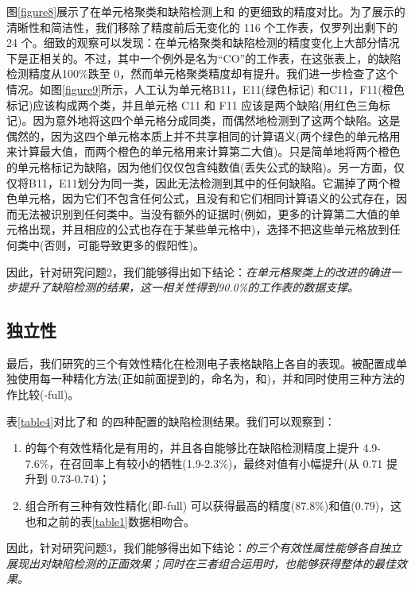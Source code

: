 图\ref{figure8}展示了在单元格聚类和缺陷检测上\wa 和 \cu 的更细致的精度对比。为了展示的清晰性和简洁性，我们移除了精度前后无变化的 116 个工作表，仅罗列出剩下的 24 个。细致的观察可以发现：在单元格聚类和缺陷检测的精度变化上大部分情况下是正相关的。不过，其中一个例外是名为“CO”的工作表，在这张表上，\wa 的缺陷检测精度从100\%跌至 0，然而单元格聚类精度却有提升。我们进一步检查了这个情况。如图\ref{figure9}所示，人工认为单元格{B11，E11}(绿色标记) 和{C11，F11}(橙色标记)应该构成两个类，并且单元格 C11 和 F11 应该是两个缺陷(用红色三角标记)。\cu 因为意外地将这四个单元格分成同类，而偶然地检测到了这两个缺陷。这是偶然的，因为这四个单元格本质上并不共享相同的计算语义(两个绿色的单元格用来计算最大值，而两个橙色的单元格用来计算第二大值)。\cu 只是简单地将两个橙色的单元格标记为缺陷，因为他们仅仅包含纯数值(丢失公式的缺陷)。另一方面，\wa 仅仅将{B11，E11}划分为同一类，因此无法检测到其中的任何缺陷。它漏掉了两个橙色单元格，因为它们不包含任何公式，且没有和它们相同计算语义的公式存在，因而无法被识别到任何类中。当没有额外的证据时(例如，更多的计算第二大值的单元格出现，并且相应的公式也存在于某些单元格中)，\wa 选择不把这些单元格放到任何类中(否则，可能导致更多的假阳性)。

因此，针对研究问题2，我们能够得出如下结论：\textit{\wa 在单元格聚类上的改进的确进一步提升了缺陷检测的结果，这一相关性得到90.0\%的工作表的数据支撑。}


\subsection{独立性}



最后，我们研究\wa 的三个有效性精化在检测电子表格缺陷上各自的表现。\wa 被配置成单独使用每一种精化方法(正如前面提到的，命名为\wasc，\wamc 和\wawc )，并和同时使用三种方法的\wa 作比较(\wa -full)。

表\ref{table4}对比了\cu 和 \wa 的四种配置的缺陷检测结果。我们可以观察到：
\begin{enumerate}
    \item \wa 的每个有效性精化是有用的，并且各自能够比\cu 在缺陷检测精度上提升 4.9-7.6\%，在召回率上有较小的牺牲(1.9-2.3\%)，最终对\fmd 值有小幅提升(从 0.71 提升到 0.73-0.74)；
    \item 组合所有三种有效性精化(即\wa -full) 可以获得最高的精度(87.8\%)和\fmd 值(0.79)，这也和之前的表\ref{table1}数据相吻合。
\end{enumerate}

因此，针对研究问题3，我们能够得出如下结论：\textit{\wa 的三个有效性属性能够各自独立展现出对缺陷检测的正面效果；同时在三者组合运用时，也能够获得整体的最佳效果。}